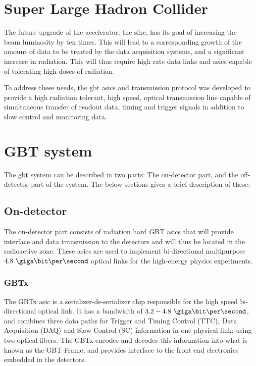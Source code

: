 \documentclass[main.tex]{subfiles}
\begin{document}
\section{Super Large Hadron Collider}

The future upgrade of the  accelerator, the \gls{slhc}, has its goal of increasing the beam luminosity by ten times. This will lead to a corresponding growth of the amount of data to be treated by the data acquisition systems, and a significant increase in radiation. This will thus require high rate data links and \glspl{asic} capable of tolerating high doses of radiation.

To address these needs, the \gls{gbt} \glspl{asic} and transmission protocol was developed to provide a high radiation tolerant, high speed, optical transmission line capable of simultaneous transfer of readout data, timing and trigger signals in addition to slow control and monitoring data.

\section{GBT system}
The \gls{gbt} system can be described in two parts: The on-detector part, and the off-detector part of the system. The below sections gives a brief description of these:

\subsection{On-detector}
The on-detector part consists of radiation hard GBT \acrshort{asic}s that will provide interface and data transmission to the detectors and will thus be located in the radioactive zone. These \glspl{asic} are used to implement bi-directional multipurpose $4.8~\giga\bit\per\second$ optical links for the high-energy physics experiments.

\subsubsection{GBTx}
The GBTx \gls{asic} is a serializer-de-serializer chip responsible for the high speed bi-directional optical link. It has a bandwidth of $3.2 - 4.8~\giga\bit\per\second$, and combines three data paths for Trigger and Timing Control (TTC), Data Acquisition (DAQ) and Slow Control (SC) information in one physical link; using two optical fibers. The GBTx encodes and decodes this information into what is known as the GBT-Frame, and provides interface to the front end electronics embedded in the detectors. \cite{gbtxman11}
\end{document}
